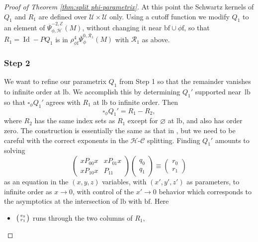 \documentclass[JEP,XML,SOM,Unicode,NoFloatCountersInSection,published]{cedram}
\newenvironment{smallpmatrix}{\big(\begin{smallmatrix}}{\end{smallmatrix}\big)}
\theoremstyle{plain}
\theoremstyle{definition}
\newcommand{\Umath}{{\mathscr{U}}}
\newcommand\calE{{\mathcal E}}
\newcommand\calR{{\mathcal R}}
\newcommand{\phif}{{\phi\mathrm{f}}}
\newcommand{\lf}{{\mathrm{lb}}}
\newcommand{\bbf}{{\mathrm{bf}}}
\DeclareMathOperator{\Id}{Id}
\newcommand{\Psibar}{\overline{\Psi}}
\begin{document}
\begin{proof}[Proof of Theorem \ref{thm:split phi-parametrix}]
At this point the Schwartz kernels of $Q_1$ and $R_1$ are defined over $\Umath\times\Umath$ only. Using a cutoff function we modify $Q_1$ to an element of $\Psibar_{\phi, \mathscr{H}}^{-2,\calE}(M)$, without changing it near $\bbf\cup\phif$, so that $R_1=\Id-PQ_1$ is in $\rho_\phif^4\Psibar_\phi^{0,\calR_1}(M)$ with $\calR_1$ as above.

\subsubsection*{Step 2}
We want to refine our parametrix $Q_1$ from Step 1 so that the remainder vanishes to
infinite order at $\lf$. We accomplish this by determining $Q_1'$ supported near~$\lf$ so that $\square_\phi Q_1'$ agrees with $R_1$ at $\lf$ to infinite order. Then
\begin{equation}
\label{eqn:Q1' eqn}
\square_\phi Q_1' = R_1 - R_2,
\end{equation}
where $R_2$ has the same index sets as $R_1$ except for $\varnothing$ at $\lf$, and also has order zero.
The construction is essentially the same as that in \cite[Lem.\,5.44]{melrose1993atiyah},
but we need to be careful with the correct exponents in the $\mathscr{H}$-$\mathscr{C}$ splitting.
Finding $Q_1'$ amounts to solving
\begin{equation}
\label{eqn:remove boundary terms}
\begin{pmatrix}
xP_{00}x & xP_{01}x \\
xP_{10}x & P_{11}
\end{pmatrix}
\begin{pmatrix}
q_0\\ q_1
\end{pmatrix}
\equiv
\begin{pmatrix}
r_0 \\
r_1
\end{pmatrix}
\end{equation}
as an equation in the $(x,y,z)$ variables, with $(x',y',z')$ as parameters,
to infinite order as $x\to0$, with control of the $x'\to0$ behavior which corresponds to
the asymptotics at the intersection of $\lf$ with $\bbf$. Here
\begin{itemize}
\item $\begin{smallpmatrix} r_0 \\ r_1 \end{smallpmatrix}$ runs through the two columns of $R_1$,


\end{itemize}
\end{proof}
\end{document}
